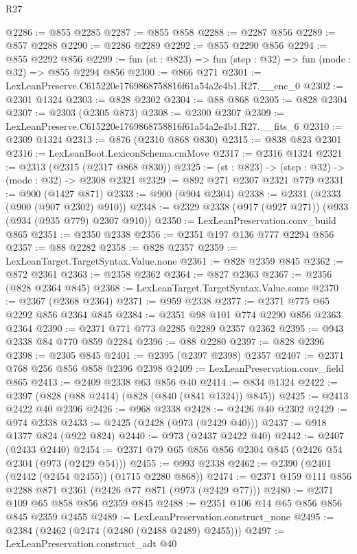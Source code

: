 \begin{lexlean}{R27}
\begin{coremodule}
@2286 := @855 @2285
@2287 := @855 @858
@2288 := @2287 @856
@2289 := @857 @2288
@2290 := @2286 @2289
@2292 := @855 @2290 @856
@2294 := @855 @2292 @856
@2299 := fun (st : @823) => fun (step : @32) => fun (mode : @32) => @855 @2294 @856
@2300 := @866 @271
@2301 := LexLeanPreserve.C615220e1769868758816f61a54a2e4b1.R27.__enc_0
@2302 := @2301 @1324
@2303 := @828 @2302
@2304 := @88 @868
@2305 := @828 @2304
@2307 := @2303 (@2305 @873)
@2308 := @2300 @2307
@2309 := LexLeanPreserve.C615220e1769868758816f61a54a2e4b1.R27.__fits_6
@2310 := @2309 @1324
@2313 := @876 (@2310 @868 @830)
@2315 := @838 @823 @2301
@2316 := LexLeanBoot.LexiconSchema.cmMove
@2317 := @2316 @1324
@2321 := @2313 (@2315 (@2317 @868 @830))
@2325 := (st : @823) -> (step : @32) -> (mode : @32) -> @2308 @2321
@2329 := @892 @271 @2307 @2321 @779
@2331 := @900 (@1427 @871)
@2333 := @900 (@904 @2304)
@2338 := @2331 (@2333 (@900 (@907 @2302) @910))
@2348 := @2329 @2338 (@917 (@927 @271)) (@933 (@934 (@935 @779) @2307 @910))
@2350 := LexLeanPreservation.conv_build @865
@2351 := @2350 @2338
@2356 := @2351 @197 @136 @777 @2294 @856
@2357 := @88 @2282
@2358 := @828 @2357
@2359 := LexLeanTarget.TargetSyntax.Value.none
@2361 := @828 @2359 @845
@2362 := @872 @2361
@2363 := @2358 @2362
@2364 := @827 @2363
@2367 := @2356 (@828 @2364 @845)
@2368 := LexLeanTarget.TargetSyntax.Value.some
@2370 := @2367 (@2368 @2364)
@2371 := @959 @2338
@2377 := @2371 @775 @65 @2292 @856 @2364 @845
@2384 := @2351 @98 @101 @774 @2290 @856 @2363 @2364
@2390 := @2371 @771 @773 @2285 @2289 @2357 @2362
@2395 := @943 @2338 @84 @770 @859 @2284
@2396 := @88 @2280
@2397 := @828 @2396
@2398 := @2305 @845
@2401 := @2395 (@2397 @2398) @2357
@2407 := @2371 @768 @256 @856 @858 @2396 @2398
@2409 := LexLeanPreservation.conv_field @865
@2413 := @2409 @2338 @63 @856 @40
@2414 := @834 @1324
@2422 := @2397 (@828 (@88 @2414) (@828 (@840 (@841 @1324)) @845))
@2425 := @2413 @2422 @40 @2396
@2426 := @968 @2338
@2428 := @2426 @40 @2302
@2429 := @974 @2338
@2433 := @2425 (@2428 (@973 (@2429 @40)))
@2437 := @918 @1377 @824 (@922 @824)
@2440 := @973 (@2437 @2422 @40)
@2442 := @2407 (@2433 @2440)
@2454 := @2371 @79 @65 @856 @856 @2304 @845 (@2426 @54 @2304 (@973 (@2429 @54)))
@2455 := @993 @2338
@2462 := @2390 (@2401 (@2442 (@2454 @2455)) (@1715 @2280 @868))
@2474 := @2371 @159 @111 @856 @2288 @871 @2361 (@2426 @77 @871 (@973 (@2429 @77)))
@2480 := @2371 @109 @65 @858 @856 @2359 @845
@2488 := @2351 @106 @14 @65 @856 @856 @845 @2359 @2455
@2489 := LexLeanPreservation.construct_none
@2495 := @2384 (@2462 (@2474 (@2480 (@2488 @2489) @2455)))
@2497 := LexLeanPreservation.construct_adt @40

\end{coremodule}
\end{lexlean}
